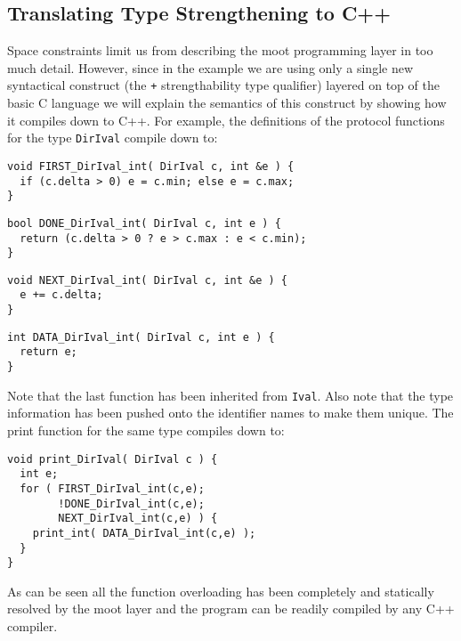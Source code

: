 \documentclass{sigplanconf}
\begin{document}
\subsection{Translating Type Strengthening to C++}

Space constraints limit us from describing the {\sc moot} programming
layer in too much detail. However, since in the example we are using
only a single new syntactical construct (the \verb-+- strengthability
type qualifier) layered on top of the basic C language we will
explain the semantics of this construct by showing how it compiles
down to C++.
For example, the definitions of the protocol functions for the type
\verb+DirIval+ compile down to:
\begin{samepage}
\begin{verbatim}
void FIRST_DirIval_int( DirIval c, int &e ) {
  if (c.delta > 0) e = c.min; else e = c.max;
}
\end{verbatim}
\end{samepage}
\begin{samepage}
\begin{verbatim}
bool DONE_DirIval_int( DirIval c, int e ) {
  return (c.delta > 0 ? e > c.max : e < c.min);
}
\end{verbatim}
\end{samepage}
\begin{samepage}
\begin{verbatim}
void NEXT_DirIval_int( DirIval c, int &e ) { 
  e += c.delta; 
}
\end{verbatim}
\end{samepage}
\begin{samepage}
\begin{verbatim}
int DATA_DirIval_int( DirIval c, int e ) { 
  return e; 
}
\end{verbatim}
\end{samepage}
Note that the last function has been inherited from \verb+Ival+. Also
note that the type information has been pushed onto the identifier
names to make them unique. The print function for the same type
compiles down to:
\begin{samepage}
\begin{verbatim}
void print_DirIval( DirIval c ) {
  int e;
  for ( FIRST_DirIval_int(c,e); 
        !DONE_DirIval_int(c,e);
        NEXT_DirIval_int(c,e) ) {
    print_int( DATA_DirIval_int(c,e) );
  }
}
\end{verbatim}
\end{samepage}
As can be seen all the function overloading has been completely and
statically resolved by the {\sc moot} layer and the program can be
readily compiled by any C++ compiler.
\end{document}
